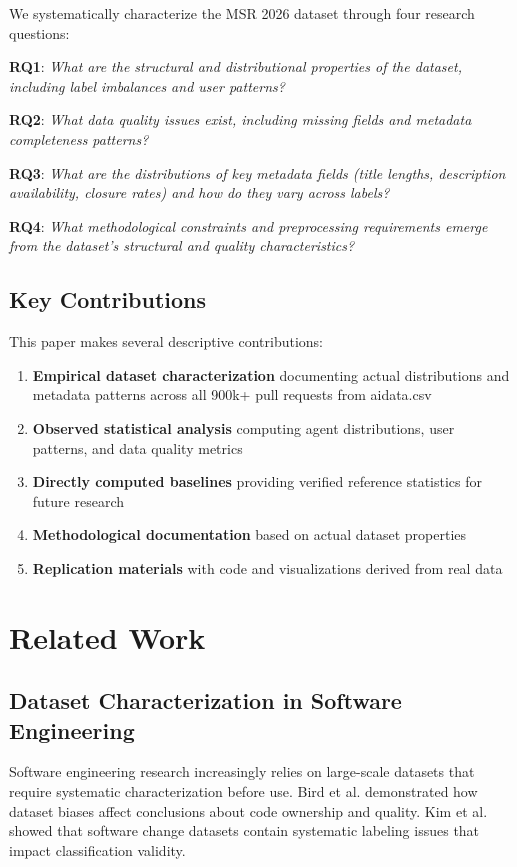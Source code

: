 \documentclass[conference]{IEEEtran}
\begin{document}
We systematically characterize the MSR 2026 dataset through four research questions:

\textbf{RQ1}: \textit{What are the structural and distributional properties of the dataset, including label imbalances and user patterns?}

\textbf{RQ2}: \textit{What data quality issues exist, including missing fields and metadata completeness patterns?}

\textbf{RQ3}: \textit{What are the distributions of key metadata fields (title lengths, description availability, closure rates) and how do they vary across labels?}

\textbf{RQ4}: \textit{What methodological constraints and preprocessing requirements emerge from the dataset's structural and quality characteristics?}

\subsection{Key Contributions}

This paper makes several descriptive contributions:
\begin{enumerate}
    \item \textbf{Empirical dataset characterization} documenting actual distributions and metadata patterns across all 900k+ pull requests from aidata.csv
    \item \textbf{Observed statistical analysis} computing agent distributions, user patterns, and data quality metrics
    \item \textbf{Directly computed baselines} providing verified reference statistics for future research
    \item \textbf{Methodological documentation} based on actual dataset properties
    \item \textbf{Replication materials} with code and visualizations derived from real data
\end{enumerate}

\section{Related Work}

\subsection{Dataset Characterization in Software Engineering}

Software engineering research increasingly relies on large-scale datasets that require systematic characterization before use. Bird et al. \cite{bird2011dont} demonstrated how dataset biases affect conclusions about code ownership and quality. Kim et al. \cite{kim2008classifying} showed that software change datasets contain systematic labeling issues that impact classification validity.
\end{document}
